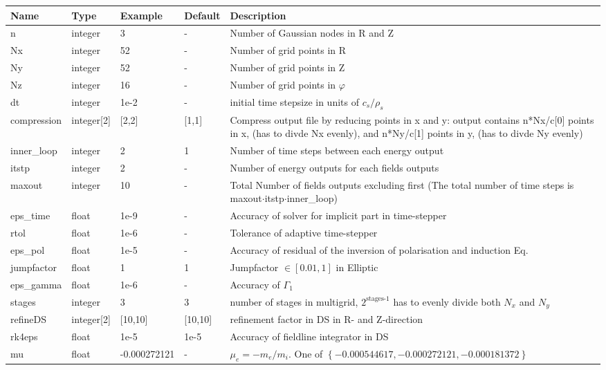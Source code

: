 \begin{longtable}{llll>{\RaggedRight}p{6cm}}
\toprule
\rowcolor{gray!50}\textbf{Name} &  \textbf{Type} & \textbf{Example} & \textbf{Default} & \textbf{Description}  \\ \midrule
n      & integer & 3 & - &Number of Gaussian nodes in R and Z \\
Nx     & integer &52& - &Number of grid points in R \\
Ny     & integer &52& - &Number of grid points in Z \\
Nz     & integer &16& - &Number of grid points in $\varphi$ \\
dt     & integer &1e-2& - &initial time stepsize in units of $c_s/\rho_s$ \\
compression & integer[2] & [2,2] & [1,1] & Compress output file by reducing points in x and y: output contains n*Nx/c[0] points in x,
    (has to divde Nx evenly), and n*Ny/c[1] points in y,
    (has to divde Ny evenly)\\
inner\_loop & integer & 2  & 1 & Number of time steps between each energy output \\
itstp       & integer & 2  & - & Number of energy outputs for each fields outputs \\
maxout      & integer & 10 & - & Total Number of fields outputs excluding first (The total number of time steps is maxout$\cdot$itstp$\cdot$inner\_loop) \\
eps\_time   & float & 1e-9  & - & Accuracy of solver for implicit part in time-stepper \\
rtol  & float &1e-6   & - &Tolerance of adaptive time-stepper \\
eps\_pol    & float & 1e-5  & - &  Accuracy of residual of the inversion of polarisation and induction Eq. \\
jumpfactor  & float & 1 & 1 & Jumpfactor $\in \left[0.01,1\right]$ in Elliptic\\
eps\_gamma  & float & 1e-6  & - & Accuracy of $\Gamma_1$  \\
stages      & integer & 3 & 3 & number of stages in multigrid, $2^{\text{stages-1}}$
has to evenly divide both $N_x$ and $N_y$\\
refineDS     & integer[2] & [10,10] & [10,10] & refinement factor in DS in R- and Z-direction\\
rk4eps     & float & 1e-5 & 1e-5 & Accuracy of fieldline integrator in DS\\
mu         & float & -0.000272121& - & $\mu_e =-m_e/m_i$.
    One of $\left\{ -0.000544617, -0.000272121, -0.000181372 \right\}$\\

\end{longtable}
